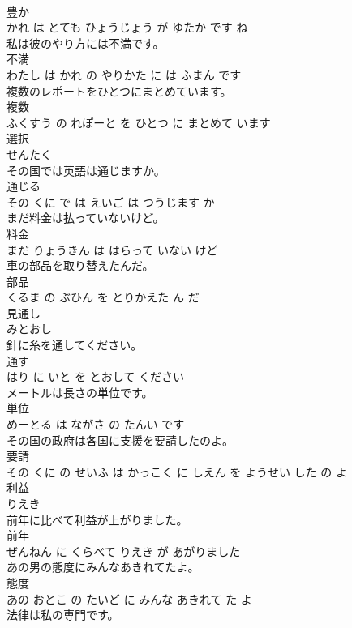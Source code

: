 \documentclass[8pt]{extreport}
\begin{document}
\begin{CJK}{UTF8}{min}
\\	豊か 
\\	かれ は とても ひょうじょう が ゆたか です ね			
\\	私は彼のやり方には不満です。	
\\	不満 
\\	わたし は かれ の やりかた に は ふまん です			
\\	複数のレポートをひとつにまとめています。	
\\	複数 
\\	ふくすう の れぽーと を ひとつ に まとめて います			
\\	選択	
\\	せんたく			
\\	その国では英語は通じますか。	
\\	通じる 
\\	その くに で は えいご は つうじます か			
\\	まだ料金は払っていないけど。	
\\	料金 
\\	まだ りょうきん は はらって いない けど			
\\	車の部品を取り替えたんだ。	
\\	部品 
\\	くるま の ぶひん を とりかえた ん だ			
\\	見通し	
\\	みとおし			
\\	針に糸を通してください。	
\\	通す 
\\	はり に いと を とおして ください			
\\	メートルは長さの単位です。	
\\	単位 
\\	めーとる は ながさ の たんい です			
\\	その国の政府は各国に支援を要請したのよ。	
\\	要請 
\\	その くに の せいふ は かっこく に しえん を ようせい した の よ			
\\	利益	
\\	りえき			
\\	前年に比べて利益が上がりました。	
\\	前年 
\\	ぜんねん に くらべて りえき が あがりました			
\\	あの男の態度にみんなあきれてたよ。	
\\	態度 
\\	あの おとこ の たいど に みんな あきれて た よ			
\\	法律は私の専門です。	

\end{CJK}
\end{document}
